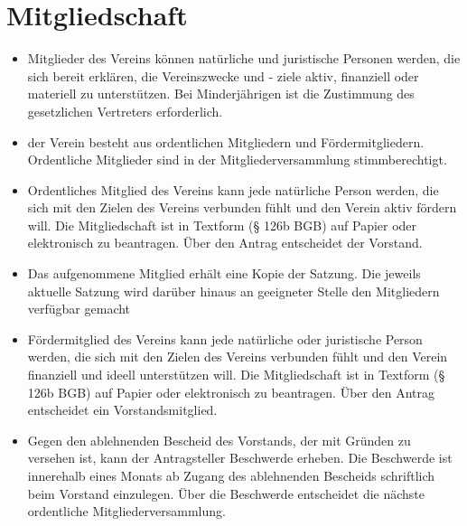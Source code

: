 \documentclass[a4paper,10pt]{article}
\begin{document}
\section{Mitgliedschaft}
  \begin{itemize}
    \item Mitglieder des Vereins können natürliche und juristische Personen werden, die sich bereit erklären, die Vereinszwecke und - ziele aktiv, finanziell oder materiell zu unterstützen. Bei Minderjährigen ist die Zustimmung des gesetzlichen Vertreters erforderlich.  
    \item der Verein besteht aus ordentlichen Mitgliedern und Fördermitgliedern. Ordentliche Mitglieder sind in der Mitgliederversammlung stimmberechtigt.
    \item Ordentliches Mitglied des Vereins kann jede natürliche Person werden, die sich mit den Zielen des Vereins verbunden fühlt und den Verein aktiv fördern will. Die Mitgliedschaft ist in Textform (§ 126b BGB) auf Papier oder elektronisch zu beantragen. Über den Antrag entscheidet der Vorstand.
    \item Das aufgenommene Mitglied erhält eine Kopie der Satzung. Die jeweils aktuelle Satzung wird darüber hinaus an geeigneter Stelle den Mitgliedern verfügbar gemacht
    \item Fördermitglied des Vereins kann jede natürliche oder juristische Person werden, die sich mit den Zielen des Vereins verbunden fühlt und den Verein finanziell und ideell unterstützen will. Die Mitgliedschaft ist in Textform (§ 126b BGB) auf Papier oder elektronisch zu beantragen. Über den Antrag entscheidet ein Vorstandsmitglied.
    \item Gegen den ablehnenden Bescheid des Vorstands, der mit Gründen zu versehen ist, kann der Antragsteller Beschwerde erheben. Die Beschwerde ist innerehalb eines Monats ab Zugang des ablehnenden Bescheids schriftlich beim Vorstand einzulegen. Über die Beschwerde entscheidet die nächste ordentliche Mitgliederversammlung.
  \end{itemize}
  
\end{document}
